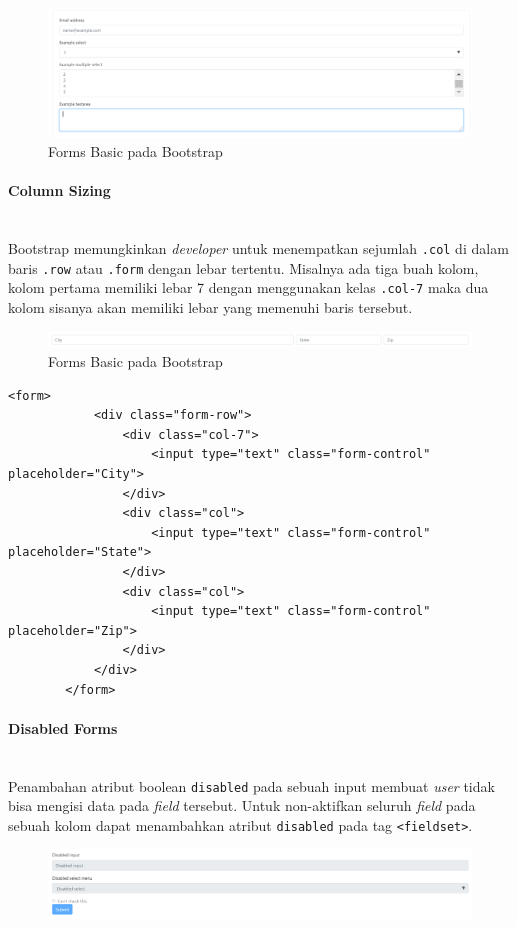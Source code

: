 \documentclass[a4paper,twoside]{article}
\newcommand{\myparagraph}[1]{\paragraph{#1}\mbox{}\\}
\begin{document}
\begin{enumerate}
		\begin{figure} [H]
			\centering  
			\includegraphics[scale=0.7]{formsbasic_bootstrap.png}  
			\caption{Forms Basic pada Bootstrap} 
		\end{figure} 
		\myparagraph{Column Sizing}
		Bootstrap memungkinkan \textit{developer} untuk menempatkan sejumlah \colorbox{mygray}{\texttt{.col}} di dalam baris \colorbox{mygray}{\texttt{.row}} atau \colorbox{mygray}{\texttt{.form}} dengan lebar tertentu. Misalnya ada tiga buah kolom, kolom pertama memiliki lebar 7 dengan menggunakan kelas \colorbox{mygray}{\texttt{.col-7}} maka dua kolom sisanya akan memiliki lebar yang  memenuhi baris tersebut.
		\begin{figure} [H]
			\centering  
			\includegraphics[scale=0.7]{columnsizing_bootstrap.png}  
			\caption{Forms Basic pada Bootstrap} 
		\end{figure} 
		\begin{lstlisting}[frame=single] 
		<form>
			<div class="form-row">
				<div class="col-7">
					<input type="text" class="form-control" placeholder="City">
				</div>
				<div class="col">
					<input type="text" class="form-control" placeholder="State">
				</div>
				<div class="col">
					<input type="text" class="form-control" placeholder="Zip">
				</div>
			</div>
		</form>
		\end{lstlisting}
		\myparagraph{Disabled Forms}
		Penambahan atribut boolean \colorbox{mygray}{\texttt{disabled}} pada sebuah input membuat \textit{user} tidak bisa mengisi data pada \textit{field} tersebut. Untuk non-aktifkan seluruh \textit{field} pada sebuah kolom dapat menambahkan atribut \texttt{disabled} pada tag \colorbox{mygray}{\texttt{<fieldset>}}.
		\begin{figure} [H]
			\centering  
			\includegraphics[scale=0.7]{disabledforms_bootstrap.png}  

\end{figure}
\end{enumerate}
\end{document}
